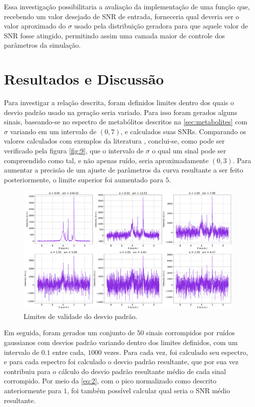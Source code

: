 \documentclass[
12pt,		
twoside, 
a4paper,
chapter=TITLE,
english,			
brazil]{USPSC-classe/USPSC}
\begin{document}
Essa investigação possibilitaria a avaliação da implementação de uma função que, recebendo um valor desejado de SNR de entrada, forneceria qual deveria ser o valor aproximado do $\sigma$ usado pela distribuição 
geradora para que aquele valor de SNR fosse atingido, permitindo assim uma camada maior de controle dos parâmetros da simulação.

\section{Resultados e Discussão}

Para investigar a relação descrita, foram definidos limites dentro dos quais o desvio padrão usado na geração seria variado. Para isso foram gerados alguns sinais, baseando-se no espectro de metabólitos descritos na \autoref{sec:metabolites} com $\sigma$ variando em um intervalo de $(0, 7)$, e calculados suas SNRs.
Comparando os valores calculados com exemplos da literatura \cite{}, conclui-se, como pode ser verificado pela figura \autoref{fig:9}, que o intervalo de $\sigma$ o qual um sinal pode ser compreendido como tal, e não apenas ruído, seria aproximadamente $(0, 3)$. Para aumentar a precisão de um ajuste de parâmetros da 
curva resultante a ser feito posteriormente, o limite superior foi aumentado para $5$.

\begin{figure}[H]
    \includegraphics[scale=0.22]{snr_limits.png}
    \centering
    \caption{Limites de validade do desvio padrão.}
    \label{fig:9}
\end{figure}

Em seguida, foram gerados um conjunto de $50$ sinais corrompidos por ruídos gaussianos com desvios padrão variando dentro dos limites definidos, com um intervalo de $0.1$ entre cada, $1000$ vezes. Para cada vez, foi calculado seu espectro, e para cada espectro foi calculado o desvio padrão resultante, que por sua vez contribuiu para o cálculo do desvio padrão 
resultante médio de cada sinal corrompido. Por meio da \autoref{eq:2}, com o pico normalizado como descrito anteriormente para $1$, foi também possível calcular qual seria o SNR médio resultante.
\end{document}
